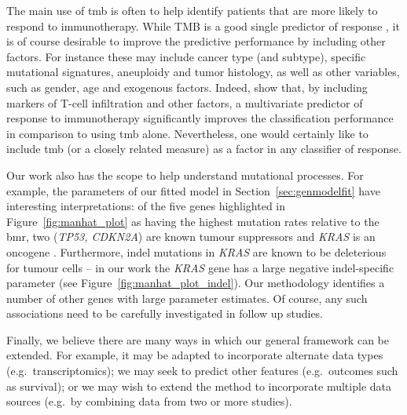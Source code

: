 \documentclass[../thesis.tex]{subfiles}
\begin{document}
{The main use of \gls{tmb} is often to help identify patients that are more likely to respond to immunotherapy. While TMB is a good single predictor of response \citep{cao_high_2019, zhu_association_2019}, it is of course desirable to improve the predictive performance by including other factors. For instance these may include cancer type (and subtype), specific mutational signatures, aneuploidy and tumor histology, as well as other variables, such as gender, age and exogenous factors. Indeed, \citet{litchfield_meta-analysis_2021} show that, by including markers of T-cell infiltration and other factors, a multivariate predictor of response to immunotherapy significantly improves the classification performance in comparison to using \gls{tmb} alone.  Nevertheless, one would certainly like to include \gls{tmb} (or a closely related measure) as a factor in any classifier of response. } 

Our work also has the scope to help understand mutational processes. For example, the parameters of our fitted model in Section~\ref{sec:genmodelfit} have interesting interpretations: {of the five genes highlighted in Figure~\ref{fig:manhat_plot} as having the highest mutation rates relative to the \gls{bmr}, two (\textit{TP53, CDKN2A}) are known tumour suppressors \citep{olivier_tp53_2010, foulkes_cdkn2a_1997} and \textit{KRAS} is an oncogene \citep{jancik_clinical_2010}.} Furthermore, indel mutations in \textit{KRAS} are known to be deleterious for tumour cells \citep{lee_selective_2018} -- in our work the \textit{KRAS} gene has a large negative indel-specific parameter (see Figure~\ref{fig:manhat_plot_indel}).  Our methodology identifies a number of other genes with large parameter estimates.  {Of course, any such associations need to be carefully investigated in follow up studies.} 

Finally, we believe there are many ways in which our general framework can be extended. For example, it may be adapted to incorporate alternate data types (e.g.~transcriptomics); we may seek to predict other features (e.g.~outcomes such as survival); or we may wish to extend the method to incorporate multiple data sources  (e.g.~{by combining data from two or more studies}).

\dobib %
\end{document}
